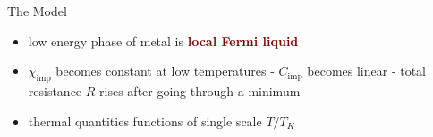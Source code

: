 \documentclass[aspectratio=169]{beamer}
\newcommand{\focus}[1]{\textcolor{maroon}{\textbf{#1}}}
\begin{document}
\begin{frame}[noframenumbering]{The Model}
{\begin{minipage}{0.68\textwidth}
\begin{itemize}[<+-|alert@+>]
\item low energy phase of metal is \focus{local Fermi liquid}\\[10pt]
\item \(\chi_\text{imp}\) becomes constant at low temperatures - \(C_\text{imp}\) becomes linear - total resistance \(R\) rises after going through a minimum\\[10pt]
\item thermal quantities functions of single scale \(T/T_K\)\\[10pt]
\end{itemize}
\end{minipage}
\begin{minipage}{0.3\textwidth}
	

\end{minipage}}
\end{frame}
\end{document}
